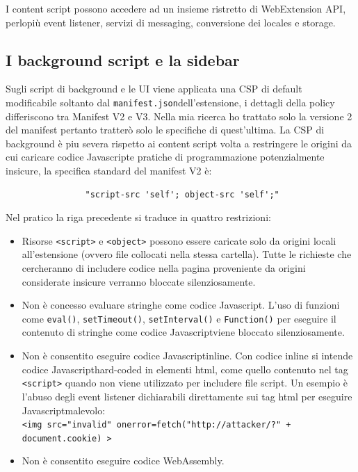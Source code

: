 \documentclass{sapthesis}
\newcommand{\code}[1]{\texttt{#1}}
\newcommand{\JS}{Javascript}
\newcommand{\manifest}{\code{manifest.json}}
\begin{document}
            I content script possono accedere ad un insieme ristretto di WebExtension API, perlopiù event listener,
            servizi di messaging, conversione dei locales e storage.

        \subsection{I background script e la sidebar}
        \label{sec:difese-background-sidebar}
            Sugli script di background e le UI viene applicata una CSP di default modificabile soltanto dal
            \manifest dell'estensione, i dettagli della policy differiscono tra Manifest V2 e V3. Nella
            mia ricerca ho trattato solo la versione 2 del manifest pertanto tratterò solo le specifiche
            di quest'ultima.
            La CSP di background è piu severa rispetto ai content script volta a restringere le origini
            da cui caricare codice \JS e pratiche di programmazione potenzialmente insicure, la specifica
            standard del manifest V2 è:
            \begin{lstlisting}
                "script-src 'self'; object-src 'self';"
            \end{lstlisting}
            Nel pratico la riga precedente si traduce in quattro restrizioni:
            \begin{itemize}
                \item Risorse \code{<script>} e \code{<object>} possono essere caricate solo da origini
                        locali all'estensione (ovvero file collocati nella stessa cartella). Tutte le
                        richieste che cercheranno di includere codice nella pagina proveniente da origini
                        considerate insicure verranno bloccate silenziosamente.

                \item Non è concesso evaluare stringhe come codice \JS. L'uso di funzioni come
                        \code{eval()}, \code{setTimeout()}, \code{setInterval()} e \code{Function()}
                        per eseguire il contenuto di stringhe come codice \JS viene bloccato silenziosamente.
                
                \item Non è consentito eseguire codice \JS inline. Con codice inline si intende codice
                        \JS hard-coded in elementi html, come quello contenuto nel tag \code{<script>}
                        quando non viene utilizzato per includere file script. Un esempio è l'abuso degli
                        event listener dichiarabili direttamente sui tag html per eseguire \JS malevolo:\\
                        \code{<img src="invalid" onerror=fetch("http://attacker/?" + document.cookie) >}        

                \item {} Non è consentito eseguire codice WebAssembly.
            
            \end{itemize}
\end{document}
